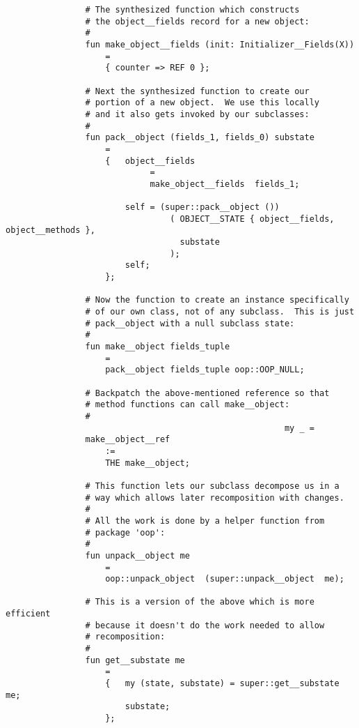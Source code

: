 \begin{verbatim}
                # The synthesized function which constructs
                # the object__fields record for a new object:
                #
                fun make_object__fields (init: Initializer__Fields(X))
                    =
                    { counter => REF 0 };

                # Next the synthesized function to create our
                # portion of a new object.  We use this locally
                # and it also gets invoked by our subclasses:
                #
                fun pack__object (fields_1, fields_0) substate
                    =
                    {   object__fields
                             =
                             make_object__fields  fields_1;

                        self = (super::pack__object ())
                                 ( OBJECT__STATE { object__fields, object__methods },
                                   substate
                                 );
                        self;
                    };

                # Now the function to create an instance specifically
                # of our own class, not of any subclass.  This is just
                # pack__object with a null subclass state:
                #
                fun make__object fields_tuple
                    =
                    pack__object fields_tuple oop::OOP_NULL;

                # Backpatch the above-mentioned reference so that
                # method functions can call make__object:
                #
                                                        my _ =
                make__object__ref
                    :=
                    THE make__object;

                # This function lets our subclass decompose us in a
                # way which allows later recomposition with changes.
                #
                # All the work is done by a helper function from
                # package 'oop':
                #
                fun unpack__object me
                    =
                    oop::unpack_object  (super::unpack__object  me);

                # This is a version of the above which is more efficient
                # because it doesn't do the work needed to allow
                # recomposition:
                #
                fun get__substate me
                    =
                    {   my (state, substate) = super::get__substate me;
                        substate;
                    };


\end{verbatim}
